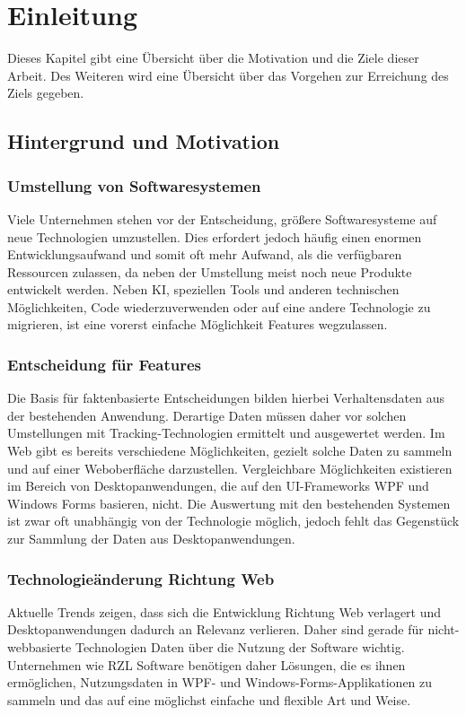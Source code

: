 \chapter{Einleitung}
Dieses Kapitel gibt eine Übersicht über die Motivation und die Ziele dieser Arbeit. 
Des Weiteren wird eine Übersicht über das Vorgehen zur Erreichung des Ziels gegeben.

\section{Hintergrund und Motivation}

\subsection{Umstellung von Softwaresystemen}
Viele Unternehmen stehen vor der Entscheidung, größere Softwaresysteme auf neue Technologien umzustellen. Dies erfordert jedoch häufig einen enormen Entwicklungsaufwand und somit oft mehr Aufwand, als die verfügbaren Ressourcen zulassen, da neben der Umstellung meist noch neue Produkte entwickelt werden. Neben KI, speziellen Tools und anderen technischen Möglichkeiten, Code wiederzuverwenden oder auf eine andere Technologie zu migrieren, ist eine vorerst einfache Möglichkeit Features wegzulassen.

\subsection{Entscheidung für Features}
Die Basis für faktenbasierte Entscheidungen bilden hierbei Verhaltensdaten aus der bestehenden Anwendung. Derartige Daten müssen daher vor solchen Umstellungen mit Tracking-Technologien ermittelt und ausgewertet werden. Im Web gibt es bereits verschiedene Möglichkeiten, gezielt solche Daten zu sammeln und auf einer Weboberfläche darzustellen. Vergleichbare Möglichkeiten existieren im Bereich von Desktopanwendungen, die auf den UI-Frameworks WPF und Windows Forms basieren, nicht. Die Auswertung mit den bestehenden Systemen ist zwar oft unabhängig von der Technologie möglich, jedoch fehlt das Gegenstück zur Sammlung der Daten aus Desktopanwendungen.

\subsection{Technologieänderung Richtung Web}
Aktuelle Trends zeigen, dass sich die Entwicklung Richtung Web verlagert und Desktopanwendungen dadurch an Relevanz verlieren. Daher sind gerade für nicht-webbasierte Technologien Daten über die Nutzung der Software wichtig. Unternehmen wie RZL Software benötigen daher Lösungen, die es ihnen ermöglichen, Nutzungsdaten in WPF- und Windows-Forms-Applikationen zu sammeln und das auf eine möglichst einfache und flexible Art und Weise.

